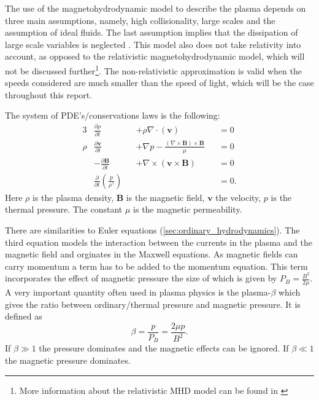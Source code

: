 \documentclass[a4paper]{article}
\numberwithin{figure}{section}
\numberwithin{equation}{section}
\begin{document}
The use of the magnetohydrodynamic model to describe the plasma depends on three main assumptions, namely, high collisionality, large scales and the assumption of ideal fluids. The last assumption implies that the dissipation of large scale variables is neglected \cite{goedbloed2004principles}. This model also does not take relativity into account, as opposed to the relativistic magnetohydrodynamic model, which will not be discussed further\footnote{More information about the relativistic MHD model can be found in \cite{karas2005introduction}}. The non-relativistic approximation is valid when the speeds considered are much smaller than the speed of light, which will be the case throughout this report.

The system of PDE's/conservations laws is the following:
\begin{alignat}{3}
    &\frac{\partial \rho}{\partial t} &&+ \rho \nabla  \cdot (\mathbf v) &&= 0 \tag{mass}\label{eq:mass}\\
    \rho&\frac{\partial \mathbf v}{\partial t} &&+  \nabla p - \frac{(\nabla \times \mathbf{B}) \times \mathbf{B}}{\mu} &&= 0 \tag{moment}\label{eq:cauchymoment}\\
    &-\frac{\partial \mathbf B}{\partial t} &&+ \nabla \times (\mathbf{v} \times \mathbf{B}) &&= 0 \tag{charge}\label{eq:faraday}\\
    &\frac{\partial}{\partial t}\left(\frac{p}{\rho^\gamma}\right) && &&= 0 \tag{energy}\label{eq:energy}.
\end{alignat} 
Here $\rho$ is the plasma density, $\mathbf B$ is the magnetic field,  $\mathbf v$ the velocity, $p$ is the thermal pressure. The constant $\mu$ is the magnetic permeability. 

There are similarities to Euler equations (\cref{sec:ordinary_hydrodynamics}).
The third equation models the interaction between the currents in the plasma and the magnetic field and orginates in the Maxwell equations.
As magnetic fields can carry momentum \cite[section 8.2]{GriffithsDavidJeffery2017Ite} a term has to be added to the momentum equation. 
This term incorporates the effect of magnetic pressure the size of which is given by $P_B = \frac{B^2}{2\mu}$. 
A very important quantity often used in plasma physics is the plasma-$\beta$ which gives the ratio between ordinary/thermal pressure and magnetic pressure. It is defined as \[
\beta = \frac{p}{P_B} = \frac{2 \mu p}{B^2}
.\] 
If $\beta \gg 1$ the pressure dominates and the magnetic effects can be ignored. If $\beta \ll 1$ the magnetic pressure dominates.
\end{document}
